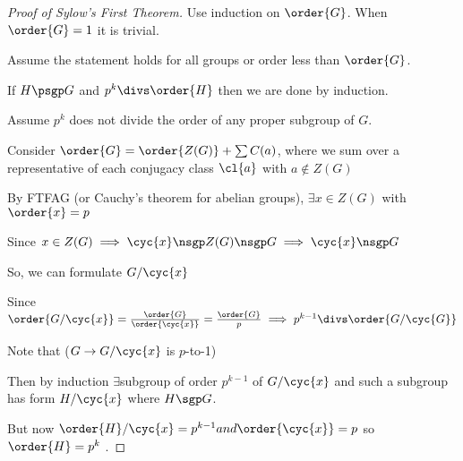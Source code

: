 \begin{proof}[Proof of Sylow's First Theorem]
    Use induction on \(\order{G}\). When \(\order{G}=1\) it is trivial.

    Assume the statement holds for all groups or order less than \(\order{G}\).

    If \(H \psgp G\) and \(p^k\divs \order{H}\) then we are done by induction.

    Assume \(p^k\) does not divide the order of any proper subgroup of \(G\).

    Consider \(\order{G}=\order{Z(G)} + \sum\index{G}{C(a)}\), where we sum over a representative of each conjugacy class \(\cl{a}\) with \(a\not\in Z(G)\)

    By FTFAG (or Cauchy's theorem for abelian groups), \(\exists x \in Z(G)\) with \(\order{x}=p\)

    Since \(x\in Z(G)\implies \cyc{x}\nsgp Z(G)\nsgp G \implies \cyc{x}\nsgp G\)

    So, we can formulate \(G / \cyc{x}\)

    Since \(\order{G / \cyc{x}} = \frac{\order{G}}{\order{\cyc{x}}}=\frac{\order{G}}{p} \implies p^{k-1}\divs \order{G / \cyc{G}}\)

    Note that (\(G\to G / \cyc{x}\) is \(p\)-to-1)

    Then by induction \(\exists\)subgroup of order \(p^{k-1}\) of \(G / \cyc{x}\) and such a subgroup has form \(H / \cyc{x}\) where \(H\sgp G\).

    But now \(\order{H} / \cyc{x} = p^{k-1} and \order{\cyc{x}}=p\) so \(\order{H} = p^k\) \contradiction.
\end{proof}